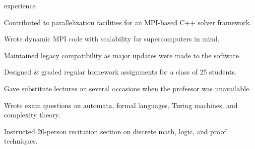 \documentclass{cv}
\begin{document}

\begin{cvsection}{experience}
  {
    \item Contributed to parallelization facilities for an MPI-based C++ solver framework.
    \item Wrote dynamic MPI code with scalability for supercomputers in mind.
    \item Maintained legacy compatibility as major updates were made to the software.
  }
  {
    \item Designed \& graded regular homework assignments for a class of 25 students.
    \item Gave substitute lectures on several occasions when the professor was unavailable.
    \item Wrote exam questions on automata, formal languages, Turing machines, and complexity theory.
  }
  {
    \item Instructed 20-person recitation section on discrete math, logic, and proof techniques.
  }
\end{cvsection}
\end{document}
